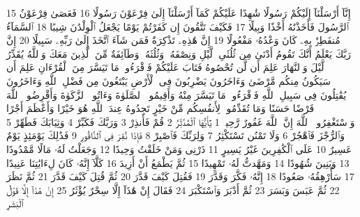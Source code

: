 {\tiny\colorbox{cl_aya}{15}} إِنَّآ أَرْسَلْنَآ إِلَيْكُمْ رَسُولًا شَٰهِدًا عَلَيْكُمْ كَمَآ أَرْسَلْنَآ إِلَىٰ فِرْعَوْنَ رَسُولًا
{\tiny\colorbox{cl_aya}{16}} فَعَصَىٰ فِرْعَوْنُ ٱلرَّسُولَ فَأَخَذْنَٰهُ أَخْذًا وَبِيلًا
{\tiny\colorbox{cl_aya}{17}} فَكَيْفَ تَتَّقُونَ إِن كَفَرْتُمْ يَوْمًا يَجْعَلُ ٱلْوِلْدَٰنَ شِيبًا
{\tiny\colorbox{cl_aya}{18}} ٱلسَّمَآءُ مُنفَطِرٌۢ بِهِۦ كَانَ وَعْدُهُۥ مَفْعُولًا
{\tiny\colorbox{cl_aya}{19}} إِنَّ هَٰذِهِۦ تَذْكِرَةٌ فَمَن شَآءَ ٱتَّخَذَ إِلَىٰ رَبِّهِۦ سَبِيلًا
{\tiny\colorbox{cl_aya}{20}} إِنَّ رَبَّكَ يَعْلَمُ أَنَّكَ تَقُومُ أَدْنَىٰ مِن ثُلُثَىِ ٱلَّيْلِ وَنِصْفَهُۥ وَثُلُثَهُۥ وَطَآئِفَةٌ مِّنَ ٱلَّذِينَ مَعَكَ وَٱللَّهُ يُقَدِّرُ ٱلَّيْلَ وَٱلنَّهَارَ عَلِمَ أَن لَّن تُحْصُوهُ فَتَابَ عَلَيْكُمْ فَٱقْرَءُوا۟ مَا تَيَسَّرَ مِنَ ٱلْقُرْءَانِ عَلِمَ أَن سَيَكُونُ مِنكُم مَّرْضَىٰ وَءَاخَرُونَ يَضْرِبُونَ فِى ٱلْأَرْضِ يَبْتَغُونَ مِن فَضْلِ ٱللَّهِ وَءَاخَرُونَ يُقَٰتِلُونَ فِى سَبِيلِ ٱللَّهِ فَٱقْرَءُوا۟ مَا تَيَسَّرَ مِنْهُ وَأَقِيمُوا۟ ٱلصَّلَوٰةَ وَءَاتُوا۟ ٱلزَّكَوٰةَ وَأَقْرِضُوا۟ ٱللَّهَ قَرْضًا حَسَنًا وَمَا تُقَدِّمُوا۟ لِأَنفُسِكُم مِّنْ خَيْرٍ تَجِدُوهُ عِندَ ٱللَّهِ هُوَ خَيْرًا وَأَعْظَمَ أَجْرًا وَٱسْتَغْفِرُوا۟ ٱللَّهَ إِنَّ ٱللَّهَ غَفُورٌ رَّحِيمٌۢ
{\tiny\colorbox{cl_aya}{1}} يَٰٓأَيُّهَا ٱلْمُدَّثِّرُ
{\tiny\colorbox{cl_aya}{2}} قُمْ فَأَنذِرْ
{\tiny\colorbox{cl_aya}{3}} وَرَبَّكَ فَكَبِّرْ
{\tiny\colorbox{cl_aya}{4}} وَثِيَابَكَ فَطَهِّرْ
{\tiny\colorbox{cl_aya}{5}} وَٱلرُّجْزَ فَٱهْجُرْ
{\tiny\colorbox{cl_aya}{6}} وَلَا تَمْنُن تَسْتَكْثِرُ
{\tiny\colorbox{cl_aya}{7}} وَلِرَبِّكَ فَٱصْبِرْ
{\tiny\colorbox{cl_aya}{8}} فَإِذَا نُقِرَ فِى ٱلنَّاقُورِ
{\tiny\colorbox{cl_aya}{9}} فَذَٰلِكَ يَوْمَئِذٍ يَوْمٌ عَسِيرٌ
{\tiny\colorbox{cl_aya}{10}} عَلَى ٱلْكَٰفِرِينَ غَيْرُ يَسِيرٍ
{\tiny\colorbox{cl_aya}{11}} ذَرْنِى وَمَنْ خَلَقْتُ وَحِيدًا
{\tiny\colorbox{cl_aya}{12}} وَجَعَلْتُ لَهُۥ مَالًا مَّمْدُودًا
{\tiny\colorbox{cl_aya}{13}} وَبَنِينَ شُهُودًا
{\tiny\colorbox{cl_aya}{14}} وَمَهَّدتُّ لَهُۥ تَمْهِيدًا
{\tiny\colorbox{cl_aya}{15}} ثُمَّ يَطْمَعُ أَنْ أَزِيدَ
{\tiny\colorbox{cl_aya}{16}} كَلَّآ إِنَّهُۥ كَانَ لِءَايَٰتِنَا عَنِيدًا
{\tiny\colorbox{cl_aya}{17}} سَأُرْهِقُهُۥ صَعُودًا
{\tiny\colorbox{cl_aya}{18}} إِنَّهُۥ فَكَّرَ وَقَدَّرَ
{\tiny\colorbox{cl_aya}{19}} فَقُتِلَ كَيْفَ قَدَّرَ
{\tiny\colorbox{cl_aya}{20}} ثُمَّ قُتِلَ كَيْفَ قَدَّرَ
{\tiny\colorbox{cl_aya}{21}} ثُمَّ نَظَرَ
{\tiny\colorbox{cl_aya}{22}} ثُمَّ عَبَسَ وَبَسَرَ
{\tiny\colorbox{cl_aya}{23}} ثُمَّ أَدْبَرَ وَٱسْتَكْبَرَ
{\tiny\colorbox{cl_aya}{24}} فَقَالَ إِنْ هَٰذَآ إِلَّا سِحْرٌ يُؤْثَرُ
{\tiny\colorbox{cl_aya}{25}} إِنْ هَٰذَآ إِلَّا قَوْلُ ٱلْبَشَرِ
